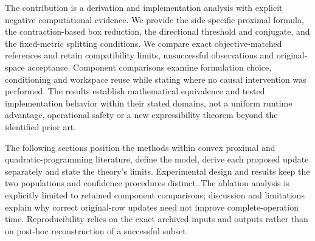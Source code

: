 The contribution is a derivation and implementation analysis with explicit
negative computational evidence. We provide the side-specific proximal formula,
the contraction-based box reduction, the directional threshold and conjugate,
and the fixed-metric splitting conditions. We compare exact objective-matched
references and retain compatibility limits, unsuccessful observations and
original-space acceptance. Component comparisons examine formulation choice,
conditioning and workspace reuse while stating where no causal intervention
was performed. The results establish mathematical equivalence and tested
implementation behavior within their stated domains, not a uniform runtime
advantage, operational safety or a new expressibility theorem beyond the
identified prior art.

The following sections position the methods within convex proximal and
quadratic-programming literature, define the model, derive each proposed
update separately and state the theory's limits. Experimental design and
results keep the two populations and confidence procedures distinct. The
ablation analysis is explicitly limited to retained component comparisons;
discussion and limitations explain why correct original-row updates need
not improve complete-operation time. Reproducibility relies on the exact
archived inputs and outputs rather than on post-hoc reconstruction of a
successful subset.
